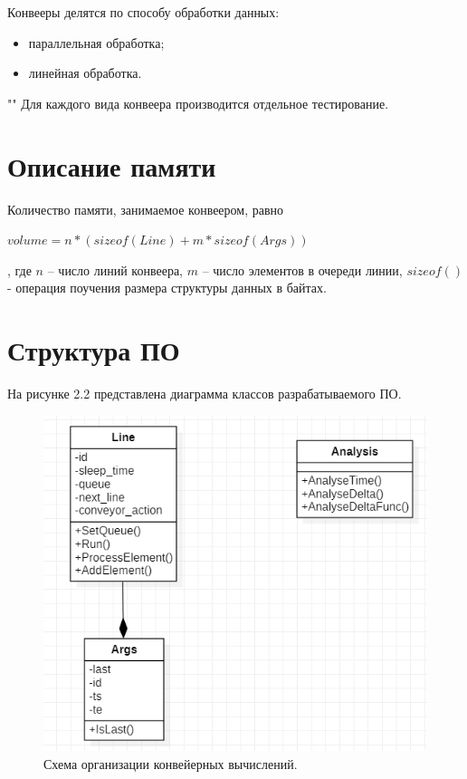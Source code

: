 \documentclass[12pt]{report}
\begin{document}
Конвееры делятся по способу обработки данных:
\begin{itemize}
	\item параллельная обработка;
	\item линейная обработка.
\end{itemize}

""\newline
Для каждого вида конвеера производится отдельное тестирование.

\section{Описание памяти}

Количество памяти, занимаемое конвеером, равно 

\begin{center}
	$volume = n * (sizeof(Line) + m * sizeof(Args))$
\end{center}

, где $n$ -- число линий конвеера, $m$ -- число элементов в очереди линии, $sizeof()$ - операция поучения размера структуры данных в байтах.

\section{Структура ПО}

На рисунке 2.2 представлена диаграмма классов разрабатываемого ПО.

\begin{figure}[H]
	\centering
	\includegraphics[scale=0.75]{imgs/software.png}
	\caption{Схема организации конвейерных вычислений.}
	\label{fig:mpr}
\end{figure}
\end{document}
